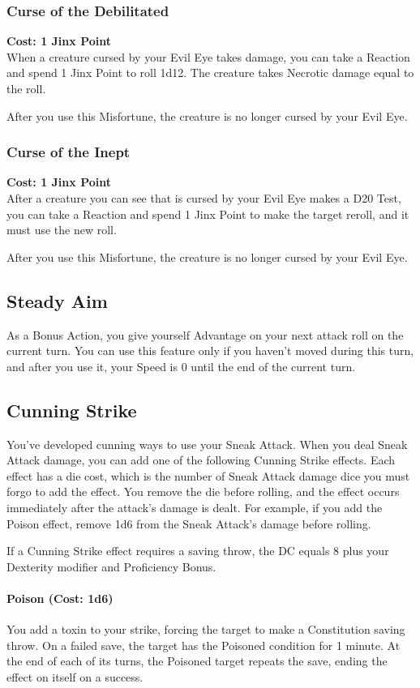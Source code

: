 \documentclass[letterpaper,openany,oneside,twocolumn]{book}
\begin{document}
\subsubsection*{Curse of the Debilitated}
\textbf{Cost: 1 Jinx Point}\\
When a creature cursed by your Evil Eye takes damage, you can take a Reaction and spend 1 Jinx Point to roll 1d12. The creature takes Necrotic damage equal to the roll.

After you use this Misfortune, the creature is no longer cursed by your Evil Eye.
\subsubsection*{Curse of the Inept}
\textbf{Cost: 1 Jinx Point}\\
After a creature you can see that is cursed by your Evil Eye makes a D20 Test, you can take a Reaction and spend 1 Jinx Point to make the target reroll, and it must use the new roll.

After you use this Misfortune, the creature is no longer cursed by your Evil Eye.
\subsection*{Steady Aim}
As a Bonus Action, you give yourself Advantage on your next attack roll on the current turn. You can use this feature only if you haven't moved during this turn, and after you use it, your Speed is 0 until the end of the current turn.
\subsection*{Cunning Strike}
You've developed cunning ways to use your Sneak Attack. When you deal Sneak Attack damage, you can add one of the following Cunning Strike effects. Each effect has a die cost, which is the number of Sneak Attack damage dice you must forgo to add the effect. You remove the die before rolling, and the effect occurs immediately after the attack's damage is dealt. For example, if you add the Poison effect, remove 1d6 from the Sneak Attack's damage before rolling.

If a Cunning Strike effect requires a saving throw, the DC equals 8 plus your Dexterity modifier and Proficiency Bonus.

\paragraph*{Poison (Cost: 1d6)} You add a toxin to your strike, forcing the target to make a Constitution saving throw. On a failed save, the target has the Poisoned condition for 1 minute. At the end of each of its turns, the Poisoned target repeats the save, ending the effect on itself on a success.
\end{document}

